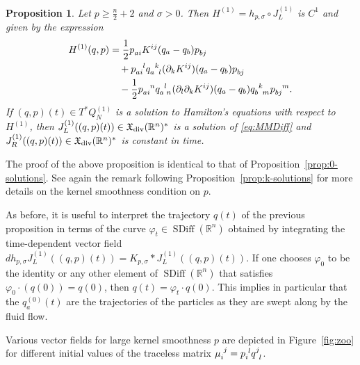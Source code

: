 \documentclass[12pt]{amsart}
\newcommand{\R}{\ensuremath{\mathbb{R}}}
\newtheorem{prop}[thm]{Proposition}
\DeclareMathOperator{\SDiff}{SDiff}
\begin{document}
  \begin{prop} \label{prop:1-solutions}
    Let $p \ge \frac{n}{2} + 2$ and $\sigma > 0$.
    Then $H^{(1)} = h_{p,\sigma} \circ J_L^{(1)}$ is $C^1$ and given by the expression
	\begin{align*}
		H^{(1)}(q,p) &= \frac{1}{2} p\indices{_a_i} K^{ij}(q_a - q_b) p\indices{_b_j}\\
			&\quad + p\indices{_a_i^l} q\indices{_a^k_l} (\partial_k K^{ij})(q_a - q_b) p\indices{_b_j} \\
			&\quad -  \frac{1}{2} p\indices{_a_i^n} q\indices{_a^l_n} (\partial_l \partial_k K^{ij})(q_a - q_b) q\indices{_b^k_m} p\indices{_b_j^m}.
  \end{align*}
  If $(q,p)(t) \in T^*Q_N^{(1)}$ is a solution to Hamilton's equations with respect to
	$H^{(1)}$, then $J_L^{(1)}( (q,p)(t)) \in \mathfrak{X}_{\rm div}(\R^n)^*$ is
	a solution of \eqref{eq:MMDiff} and $J_R^{(1)}( (q,p)(t)) \in \mathfrak{X}_{\rm div}(\R^n)^*$ is
	constant in time. 
  \end{prop}
  The proof of the above proposition is identical to that of
  Proposition~\ref{prop:0-solutions}. See again the remark following
  Proposition~\ref{prop:k-solutions} for more details on the kernel
  smoothness condition on $p$.

  As before, it is useful to interpret the trajectory $q(t)$ of the previous proposition in terms of the curve $\varphi_t \in  \SDiff(\mathbb{R}^n)$ obtained by integrating the time-dependent vector field $dh_{p, \sigma} J_L^{(1)}((q, p)(t)) = K_{p, \sigma} * J_L^{(1)}((q, p)(t))$. If one chooses $\varphi_0$ to be the identity or  any other element of $\SDiff(\mathbb{R}^n)$ that satisfies $\varphi_0 \cdot (q(0)) = q(0)$, then  $q(t) = \varphi_t \cdot  q(0)$. This implies in particular that the $q_a^{(0)}(t)$ are the trajectories of the particles as they are swept along by the fluid flow.

  Various vector fields for large kernel smoothness $p$
  are depicted in Figure~\ref{fig:zoo}
  for different initial values of the traceless matrix
  $\mu\indices{_i^j} = p\indices{_i^l} q\indices{^j_l}$.
\end{document}
